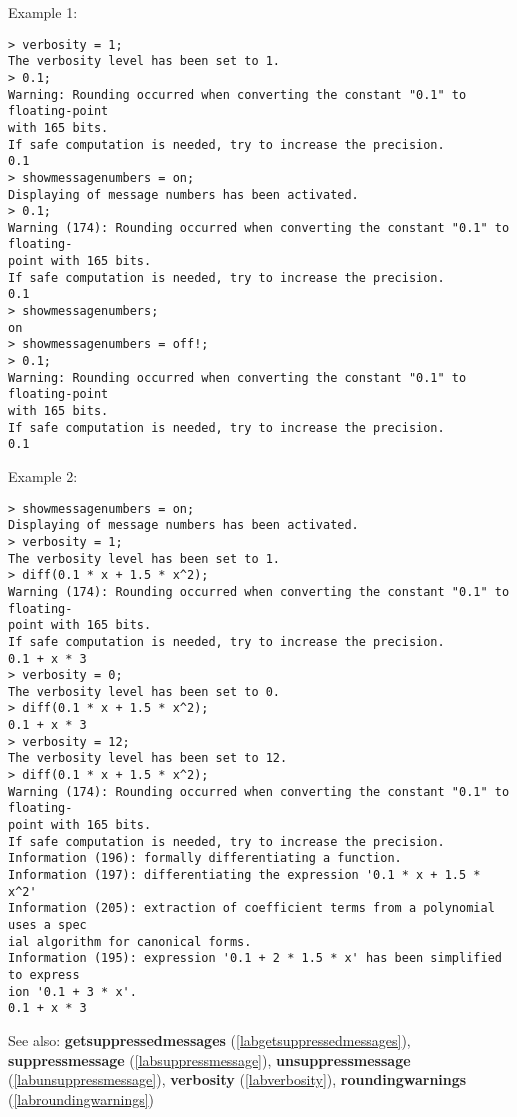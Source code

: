 \noindent Example 1: 
\begin{center}\begin{minipage}{15cm}\begin{Verbatim}[frame=single]
> verbosity = 1;
The verbosity level has been set to 1.
> 0.1;
Warning: Rounding occurred when converting the constant "0.1" to floating-point 
with 165 bits.
If safe computation is needed, try to increase the precision.
0.1
> showmessagenumbers = on;
Displaying of message numbers has been activated.
> 0.1;
Warning (174): Rounding occurred when converting the constant "0.1" to floating-
point with 165 bits.
If safe computation is needed, try to increase the precision.
0.1
> showmessagenumbers;
on
> showmessagenumbers = off!;
> 0.1;
Warning: Rounding occurred when converting the constant "0.1" to floating-point 
with 165 bits.
If safe computation is needed, try to increase the precision.
0.1
\end{Verbatim}
\end{minipage}\end{center}
\noindent Example 2: 
\begin{center}\begin{minipage}{15cm}\begin{Verbatim}[frame=single]
> showmessagenumbers = on;
Displaying of message numbers has been activated.
> verbosity = 1;
The verbosity level has been set to 1.
> diff(0.1 * x + 1.5 * x^2);
Warning (174): Rounding occurred when converting the constant "0.1" to floating-
point with 165 bits.
If safe computation is needed, try to increase the precision.
0.1 + x * 3
> verbosity = 0;
The verbosity level has been set to 0.
> diff(0.1 * x + 1.5 * x^2);
0.1 + x * 3
> verbosity = 12;
The verbosity level has been set to 12.
> diff(0.1 * x + 1.5 * x^2);
Warning (174): Rounding occurred when converting the constant "0.1" to floating-
point with 165 bits.
If safe computation is needed, try to increase the precision.
Information (196): formally differentiating a function.
Information (197): differentiating the expression '0.1 * x + 1.5 * x^2'
Information (205): extraction of coefficient terms from a polynomial uses a spec
ial algorithm for canonical forms.
Information (195): expression '0.1 + 2 * 1.5 * x' has been simplified to express
ion '0.1 + 3 * x'.
0.1 + x * 3
\end{Verbatim}
\end{minipage}\end{center}
See also: \textbf{getsuppressedmessages} (\ref{labgetsuppressedmessages}), \textbf{suppressmessage} (\ref{labsuppressmessage}), \textbf{unsuppressmessage} (\ref{labunsuppressmessage}), \textbf{verbosity} (\ref{labverbosity}), \textbf{roundingwarnings} (\ref{labroundingwarnings})
